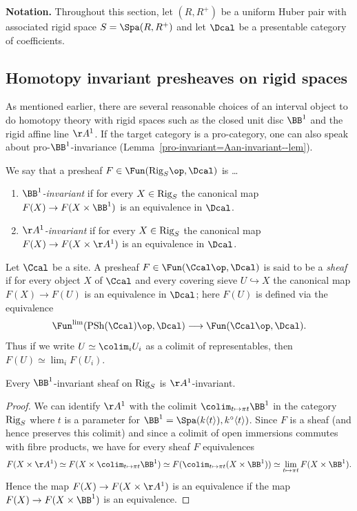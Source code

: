 \documentclass[colorinlistoftodos,article,11pt,reqno]{article}
\newcommand{\Rig}{\textup{Rig}}
\newcommand{\PSh}{\textup{PSh}}
\newcommand{\Arig}{\AA^{1}}
\newcommand{\Brig}{\BB^{1}}
\newcommand{\skp}[1]{\langle #1 \rangle}
\renewcommand{\to}[1][]{\overset{#1}{\rightarrow}}
\newcommand{\To}[1][]{\overset{#1}{\longrightarrow}}
\newcommand{\inj}[1][]{\overset{#1}{\hookrightarrow}}		%
\begin{document}
\vspace{6pt}\noindent\textbf{Notation.} Throughout this section, let $(R,R^+)$ be a uniform Huber pair with associated rigid space $S=\Spa(R,R^+)$ and let $\Dcal$ be a presentable category of coefficients.

\subsection{Homotopy invariant presheaves on rigid spaces}

As mentioned earlier, there are several reasonable choices of an interval object to do homotopy theory with rigid spaces such as the closed unit disc $\Brig$ and the rigid affine line $\Arig$. If the target category is a pro-category, one can also speak about pro-$\Brig$-invariance (Lemma~\ref{pro-invariant=Aan-invariant--lem}).

\begin{defi} \label{Aan-B1-invariance--defin}
We say that a presheaf $F\in\Fun(\Rig_S\op,\Dcal)$ is \ldots
\begin{enumerate}
	\item $\Brig$\emph{-invariant} if for every $X\in\Rig_S$ the canonical map $F(X) \to F(X\times\Brig)$ is an equivalence in $\Dcal$.
	\item $\Arig$\emph{-invariant} if for every $X\in\Rig_S$ the canonical map $F(X)\to F(X\times\Arig)$ is an equivalence in $\Dcal$.
\end{enumerate}
\end{defi}

\begin{defi}
Let $\Ccal$ be a site. A presheaf $F\in\Fun(\Ccal\op,\Dcal)$ is said to be a \emph{sheaf} if for every object $X$ of $\Ccal$ and every covering sieve $U\inj X$ the canonical map $F(X)\to F(U)$ is an equivalence in $\Dcal$; here $F(U)$ is defined via the equivalence
	\[
	\Fun^\mathrm{lim}(\PSh(\Ccal)\op,\Dcal) \To \Fun(\Ccal\op,\Dcal).
	\]
Thus if we write $U \simeq \colim_iU_i$ as a colimit of representables, then $F(U) \simeq \lim_iF(U_i)$.
\end{defi}

\begin{lemma} \label{B1-implies-Aan-invariance--lem}
Every $\Brig$-invariant sheaf on $\Rig_S$ is $\Arig$-invariant.
\end{lemma}
\begin{proof}
We can identify $\Arig$ with the colimit $\colim_{t\mapsto\pi t}\Brig$ in the category $\Rig_S$ where $t$ is a parameter for $\Brig=\Spa(k\skp{t}),k^\circ\skp{t})$. Since $F$ is a sheaf (and hence preserves this colimit) and since a colimit of open immersions commutes with fibre products, we have for every sheaf $F$ equivalences
	\begin{align*}
	F(X\times\Arig) \simeq F(X\times\colim_{t\mapsto\pi t}\Brig)
	\simeq F(\colim_{t\mapsto\pi t}(X\times\Brig))
	\simeq \lim_{t\mapsto\pi t} F(X\times\Brig).
	\end{align*}
Hence the map $F(X) \to F(X\times\Arig)$ is an equivalence if the map $F(X) \to F(X\times\Brig)$ is an equivalence.
\end{proof}
\end{document}
